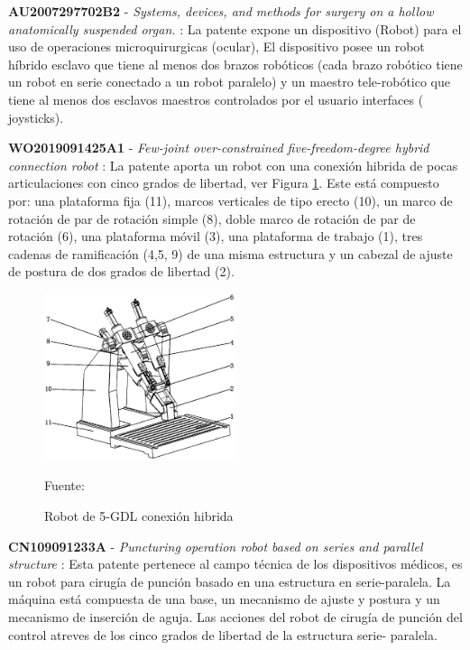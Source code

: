 \textbf{AU2007297702B2} - \textit{Systems, devices, and methods for surgery on a hollow anatomically suspended organ.} \citep{patent:AU2007297702B2}: La patente expone un dispositivo (Robot) para el uso de operaciones microquirurgicas (ocular), El dispositivo posee un robot híbrido esclavo que tiene al menos dos brazos robóticos (cada brazo robótico tiene un robot en serie conectado a un robot paralelo) y un maestro tele-robótico que tiene al menos dos esclavos maestros controlados por el usuario interfaces ( joysticks). 

\textbf{WO2019091425A1} - \textit{Few-joint over-constrained five-freedom-degree hybrid connection robot} \citep{patent:WO2019091425A1}: La patente aporta un robot con una conexión hibrida de pocas articulaciones con cinco grados de libertad, ver Figura \ref{fig:WO2019091425A1}. Este está compuesto por: una plataforma fija (11), marcos verticales de tipo erecto (10), un marco de rotación de par de rotación simple (8), doble marco de rotación de par de rotación (6), una plataforma móvil (3), una plataforma de trabajo (1), tres cadenas de ramificación (4,5, 9) de una misma estructura y un cabezal de ajuste de postura de dos grados de libertad (2).

\begin{figure}[ht!]
    \centering
    \includegraphics[width = 0.5\textwidth]{Cap2_DisenoEspecificaciones/Figura/WO2019091425A1.pdf}
    \caption{Robot de 5-GDL conexión hibrida}{Fuente:\citep{patent:WO2019091425A1}}
    \label{fig:WO2019091425A1}
\end{figure}

\textbf{CN109091233A} - \textit{Puncturing operation robot based on series and parallel structure} \citep{patent:CN109091233A}: Esta patente pertenece al campo técnica de los dispositivos médicos, es un robot para cirugía de punción basado en una estructura en serie-paralela. La máquina está compuesta de una base, un mecanismo de ajuste y postura y un mecanismo de inserción de aguja. Las acciones del robot de cirugía de punción del control atreves de los cinco grados de libertad de la estructura serie- paralela.

